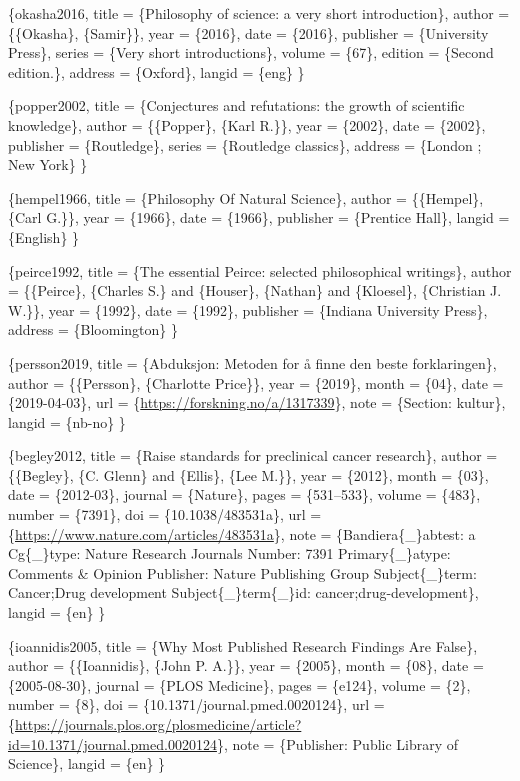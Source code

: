 \documentclass[
]{book}
\begin{document}
\citet{book}\{okasha2016,
title = \{Philosophy of science: a very short introduction\},
author = \{\{Okasha\}, \{Samir\}\},
year = \{2016\},
date = \{2016\},
publisher = \{University Press\},
series = \{Very short introductions\},
volume = \{67\},
edition = \{Second edition.\},
address = \{Oxford\},
langid = \{eng\}
\}

\citet{book}\{popper2002,
title = \{Conjectures and refutations: the growth of scientific knowledge\},
author = \{\{Popper\}, \{Karl R.\}\},
year = \{2002\},
date = \{2002\},
publisher = \{Routledge\},
series = \{Routledge classics\},
address = \{London ; New York\}
\}

\citet{book}\{hempel1966,
title = \{Philosophy Of Natural Science\},
author = \{\{Hempel\}, \{Carl G.\}\},
year = \{1966\},
date = \{1966\},
publisher = \{Prentice Hall\},
langid = \{English\}
\}

\citet{book}\{peirce1992,
title = \{The essential Peirce: selected philosophical writings\},
author = \{\{Peirce\}, \{Charles S.\} and \{Houser\}, \{Nathan\} and \{Kloesel\}, \{Christian J. W.\}\},
year = \{1992\},
date = \{1992\},
publisher = \{Indiana University Press\},
address = \{Bloomington\}
\}

\citet{misc}\{persson2019,
title = \{Abduksjon: Metoden for å finne den beste forklaringen\},
author = \{\{Persson\}, \{Charlotte Price\}\},
year = \{2019\},
month = \{04\},
date = \{2019-04-03\},
url = \{\url{https://forskning.no/a/1317339}\},
note = \{Section: kultur\},
langid = \{nb-no\}
\}

\citet{article}\{begley2012,
title = \{Raise standards for preclinical cancer research\},
author = \{\{Begley\}, \{C. Glenn\} and \{Ellis\}, \{Lee M.\}\},
year = \{2012\},
month = \{03\},
date = \{2012-03\},
journal = \{Nature\},
pages = \{531--533\},
volume = \{483\},
number = \{7391\},
doi = \{10.1038/483531a\},
url = \{\url{https://www.nature.com/articles/483531a}\},
note = \{Bandiera\{\_\}abtest: a
Cg\{\_\}type: Nature Research Journals
Number: 7391
Primary\{\_\}atype: Comments \& Opinion
Publisher: Nature Publishing Group
Subject\{\_\}term: Cancer;Drug development
Subject\{\_\}term\{\_\}id: cancer;drug-development\},
langid = \{en\}
\}

\citet{article}\{ioannidis2005,
title = \{Why Most Published Research Findings Are False\},
author = \{\{Ioannidis\}, \{John P. A.\}\},
year = \{2005\},
month = \{08\},
date = \{2005-08-30\},
journal = \{PLOS Medicine\},
pages = \{e124\},
volume = \{2\},
number = \{8\},
doi = \{10.1371/journal.pmed.0020124\},
url = \{\url{https://journals.plos.org/plosmedicine/article?id=10.1371/journal.pmed.0020124}\},
note = \{Publisher: Public Library of Science\},
langid = \{en\}
\}
\end{document}
